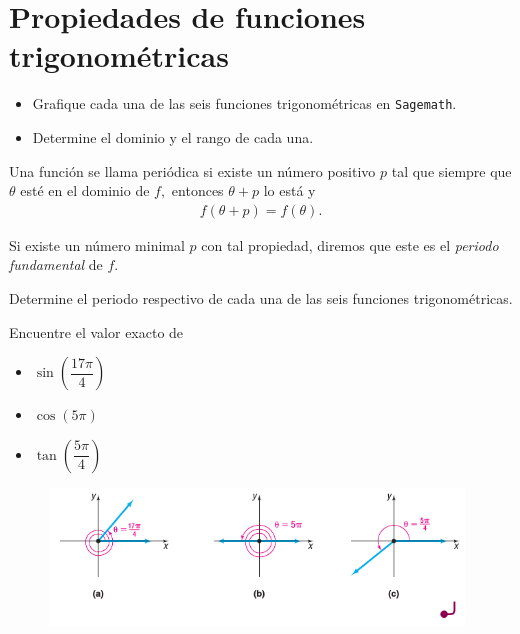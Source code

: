 
\section{Propiedades de funciones trigonométricas}

{}
	\begin{problema}
		\begin{itemize}
			\item Grafique cada una de las seis funciones trigonométricas en \texttt{Sagemath}.
			\item Determine el dominio y el rango de cada una.
		\end{itemize}  
	\end{problema}
	

{}
	\begin{defn}
		Una función se llama periódica si existe un número positivo $p$ tal que siempre que $\theta$ esté en el dominio de $f,$ entonces $\theta+p$ lo está y 
		\begin{align*}
			f(\theta+p)=f(\theta).
		\end{align*}
		
		Si existe un número minimal $p$ con tal propiedad, diremos que este es el \emph{periodo fundamental} de $f.$
	\end{defn}

{}
	\begin{problema}
		Determine el periodo respectivo de cada una de las seis funciones trigonométricas.
	\end{problema}
	


	\begin{problema}
		\label{exmp:6301}
		Encuentre el valor exacto de 
		\begin{itemize}
			\item $\sin\left( \dfrac{17\pi}{4} \right)$
			\item $\cos\left( 5\pi \right)$
			\item $\tan\left( \dfrac{5\pi}{4} \right)$
		\end{itemize}
		
	\end{problema}

{}
	\begin{figure}[h]
		\centering
		\includegraphics[width=11cm,keepaspectratio=true]{./trig/sull0628.png}
		\label{fig:0638}
	\end{figure}
	

